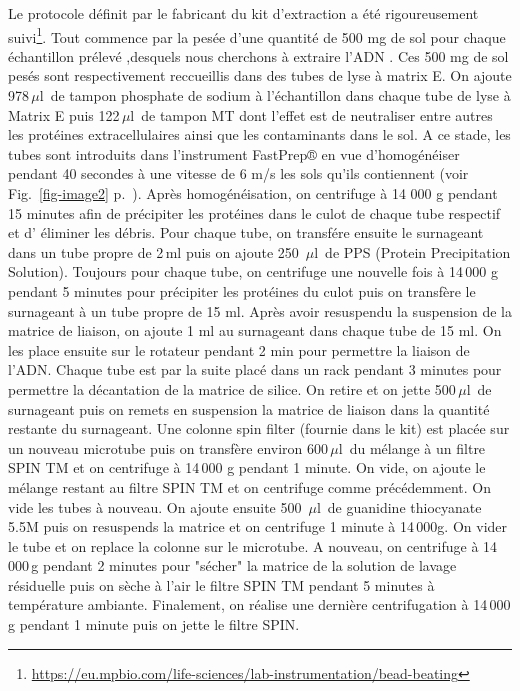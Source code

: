\documentclass[a4paper,11pt]{article}
\begin{document}
Le protocole définit par le fabricant du kit d'extraction a été
rigoureusement
suivi\footnote{\url{https://eu.mpbio.com/life-sciences/lab-instrumentation/bead-beating}}.
Tout commence par la pesée d'une quantité de 500 mg de sol pour chaque
échantillon prélevé ,desquels nous cherchons à extraire l'ADN . Ces
500 mg de sol pesés sont respectivement reccueillis dans des tubes de
lyse à matrix E.  On ajoute 978\,$\mu$l\, de tampon phosphate de
sodium à l'échantillon dans chaque tube de lyse à Matrix E puis
122\,$\mu$l\, de tampon MT dont l'effet est de neutraliser entre
autres les protéines extracellulaires ainsi que les contaminants dans
le sol.  A ce stade, les tubes sont introduits dans l'instrument
FastPrep® en vue d'homogénéiser pendant 40 secondes à une vitesse de 6
m/s les sols qu'ils contiennent (voir Fig.~\ref{fig-image2}
p.~\pageref{fig-image2}).  Après homogénéisation, on centrifuge à 14
000 g pendant 15 minutes afin de précipiter les protéines dans le
culot de chaque tube respectif et d' éliminer les débris.  Pour chaque
tube, on transfére ensuite le surnageant dans un tube propre de 2\,ml
puis on ajoute 250 \,$\mu$l\, de PPS (Protein Precipitation
Solution). Toujours pour chaque tube, on centrifuge une nouvelle fois
à 14\,000 g pendant 5 minutes pour précipiter les protéines du culot
puis on transfère le surnageant à un tube propre de 15 ml.  Après
avoir resuspendu la suspension de la matrice de liaison, on ajoute 1
ml au surnageant dans chaque tube de 15 ml. On les place ensuite sur
le rotateur pendant 2 min pour permettre la liaison de l'ADN. Chaque
tube est par la suite placé dans un rack pendant 3 minutes pour
permettre la décantation de la matrice de silice.  On retire et on
jette 500\,$\mu$l\, de surnageant puis on remets en suspension la
matrice de liaison dans la quantité restante du surnageant. Une
colonne spin filter (fournie dans le kit) est placée sur un nouveau
microtube puis on transfère environ 600\,$\mu$l\, du mélange à un
filtre SPIN TM et on centrifuge à 14\,000 g pendant 1 minute. On vide,
on ajoute le mélange restant au filtre SPIN TM et on centrifuge comme
précédemment. On vide les tubes à nouveau.  On ajoute ensuite 500
\,$\mu$l\, de guanidine thiocyanate 5.5M puis on resuspends la matrice
et on centrifuge 1 minute à 14\,000g. On vider le tube et on replace
la colonne sur le microtube.  A nouveau, on centrifuge à 14 000\,g
pendant 2 minutes pour "sécher" la matrice de la solution de lavage
résiduelle puis on sèche à l'air le filtre SPIN TM pendant 5 minutes à
température ambiante. Finalement, on réalise une dernière
centrifugation à 14\,000 g pendant 1 minute puis on jette le filtre
SPIN.
\end{document}
